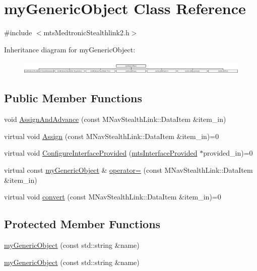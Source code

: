 \hypertarget{classmy_generic_object}{\section{my\-Generic\-Object Class Reference}
\label{classmy_generic_object}
}


{\ttfamily \#include $<$mts\-Medtronic\-Stealthlink2.\-h$>$}

Inheritance diagram for my\-Generic\-Object\-:\begin{figure}[H]
\begin{center}
\leavevmode
\includegraphics[height=0.640000cm]{d4/d1b/classmy_generic_object}
\end{center}
\end{figure}
\subsection*{Public Member Functions}
\begin{DoxyCompactItemize}
\item 
void \hyperlink{classmy_generic_object_aa34e735b068433261af72e967d392e4b}{Assign\-And\-Advance} (const M\-Nav\-Stealth\-Link\-::\-Data\-Item \&item\-\_\-in)
\item 
virtual void \hyperlink{classmy_generic_object_a88d577e8ca5a3578605420efcdb6ca42}{Assign} (const M\-Nav\-Stealth\-Link\-::\-Data\-Item \&item\-\_\-in)=0
\item 
virtual void \hyperlink{classmy_generic_object_a261039f68cd49c1f275f0d209847b493}{Configure\-Interface\-Provided} (\hyperlink{classmts_interface_provided}{mts\-Interface\-Provided} $\ast$provided\-\_\-in)=0
\item 
virtual const \hyperlink{classmy_generic_object}{my\-Generic\-Object} \& \hyperlink{classmy_generic_object_aa2902952c2148f349e68d946ce0819fd}{operator=} (const M\-Nav\-Stealth\-Link\-::\-Data\-Item \&item\-\_\-in)
\item 
virtual void \hyperlink{classmy_generic_object_a07698576bb68e39af9614f28b511fb75}{convert} (const M\-Nav\-Stealth\-Link\-::\-Data\-Item \&item\-\_\-in)=0
\end{DoxyCompactItemize}
\subsection*{Protected Member Functions}
\begin{DoxyCompactItemize}
\item 
\hyperlink{classmy_generic_object_aa7261e9f0afdf6ef9aa96513d3537159}{my\-Generic\-Object} (const std\-::string \&name)
\item 
\hyperlink{classmy_generic_object_aa7261e9f0afdf6ef9aa96513d3537159}{my\-Generic\-Object} (const std\-::string \&name)
\end{DoxyCompactItemize}
